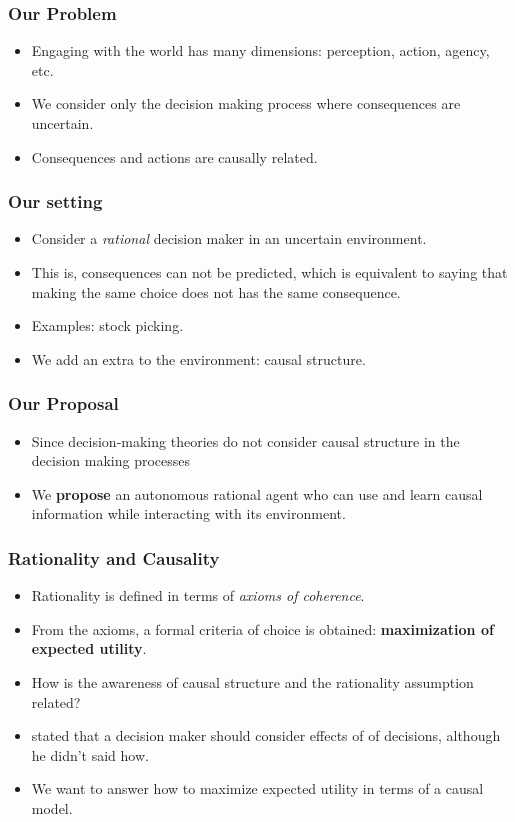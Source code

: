 \documentclass{beamer}
\theoremstyle{plain}
\begin{document}
\begin{frame}
\frametitle{Our Problem}
\begin{itemize}
\item Engaging with the world has many dimensions: perception, action, agency, etc.
\item We consider only the decision making process where consequences are uncertain.
\item Consequences and actions are causally related.
\end{itemize}
\end{frame}

\begin{frame}
\frametitle{Our setting}
\begin{itemize}
\item Consider a \textit{rational} decision maker in an uncertain environment.
\item This is, consequences can not be predicted, which is equivalent to saying that making the same choice does not has the same consequence.
\item Examples: stock picking.
\item We add an extra to the environment: causal structure. 
\end{itemize}
\end{frame}

\begin{frame}
\frametitle{Our Proposal}
\begin{itemize}
\item Since decision-making theories do not consider causal structure in the decision making processes
\item We \textbf{propose} an autonomous rational agent who can use and learn causal information while interacting with its environment.
\end{itemize}
\end{frame}

\begin{frame}
\frametitle{Rationality and Causality}
\begin{itemize}
\item Rationality is defined in terms of \textit{axioms of coherence}.
\item From the axioms, a formal criteria of choice is obtained: \textbf{maximization of expected utility}. 
\item How is the awareness of causal structure and the rationality assumption related?
\item \cite{joyce1999foundations} stated that a decision maker should consider effects of of decisions, although he didn't said how. 
\item We want to answer how to maximize expected utility in terms of a causal model. 
\end{itemize}
\end{frame}
\end{document}

